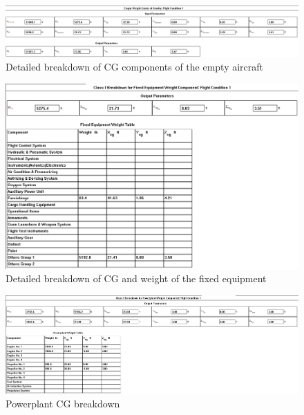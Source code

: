 \documentclass[conf]{new-aiaa}
\begin{document}
\begin{figure}[H]
    \includegraphics[width=\textwidth]{Report3Printouts/Cg/Cg_Empty_Detailed_Empty_cropped.png}
    \caption{Detailed breakdown of CG components of the empty aircraft}
    \label{fig:cg_detailed_empty}
\end{figure}

\begin{figure}[H]
    \includegraphics[width=\textwidth]{Report3Printouts/Cg/Cg_Empty_Detailed_FixedEquipment_cropped.png}
    \caption{Detailed breakdown of CG and weight of the fixed equipment}
    \label{fig:cg_empty_detailed_fixedequipment}
\end{figure}

\begin{figure}[H]
    \includegraphics[width=\textwidth]{Report3Printouts/Cg/Cg_Empty_Detailed_Powerplant_cropped.png}
    \caption{Powerplant CG breakdown}
    \label{fig:cg_empty_detailed_powerplant}
\end{figure}
\end{document}
